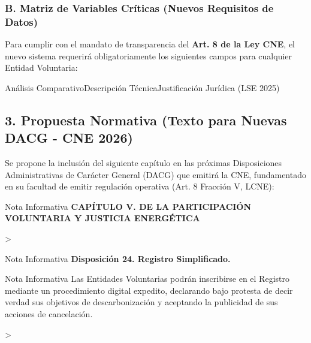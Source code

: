 \documentclass{cel}
\begin{document}
\subsubsection{B. Matriz de Variables Críticas (Nuevos Requisitos de Datos)}
\nopagebreak

Para cumplir con el mandato de transparencia del \textbf{Art. 8 de la Ley CNE}, el nuevo sistema requerirá obligatoriamente los siguientes campos para cualquier Entidad Voluntaria:


\vspace{0.3cm}
\begin{tablaParadigmaV2}{Análisis Comparativo}{Descripción Técnica}{Justificación Jurídica (LSE 2025)}
\end{tablaParadigmaV2}


\subsection{3. Propuesta Normativa (Texto para Nuevas DACG - CNE 2026)}
\nopagebreak

Se propone la inclusión del siguiente capítulo en las próximas Disposiciones Administrativas de Carácter General (DACG) que emitirá la CNE, fundamentado en su facultad de emitir regulación operativa (Art. 8 Fracción V, LCNE):


\vspace{0.2cm}
\begin{glowBox}[gobmxDorado]{Nota Informativa}
\textbf{CAPÍTULO V. DE LA PARTICIPACIÓN VOLUNTARIA Y JUSTICIA ENERGÉTICA}
\end{glowBox}
\textgreater{}

\vspace{0.2cm}
\begin{glowBox}[gobmxDorado]{Nota Informativa}
\textbf{Disposición 24. Registro Simplificado.}
\end{glowBox}
\vspace{0.2cm}
\begin{glowBox}[gobmxDorado]{Nota Informativa}
Las Entidades Voluntarias podrán inscribirse en el Registro mediante un procedimiento digital expedito, declarando bajo protesta de decir verdad sus objetivos de descarbonización y aceptando la publicidad de sus acciones de cancelación.
\end{glowBox}
\textgreater{}
\end{document}
